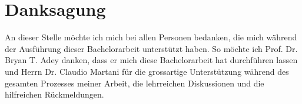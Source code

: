 %
%
%
%

\chapter*{Danksagung}
\label{chap:Danksagung}

An dieser Stelle möchte ich mich bei allen Personen bedanken, die mich während der Ausführung dieser Bachelorarbeit unterstützt haben. So möchte ich Prof. Dr. Bryan T. Adey danken, dass er mich diese Bachelorarbeit hat durchführen lassen und Herrn Dr. Claudio Martani für die grossartige Unterstützung während des gesamten Prozesses meiner Arbeit, die lehrreichen Diskussionen und die hilfreichen Rückmeldungen.

%

